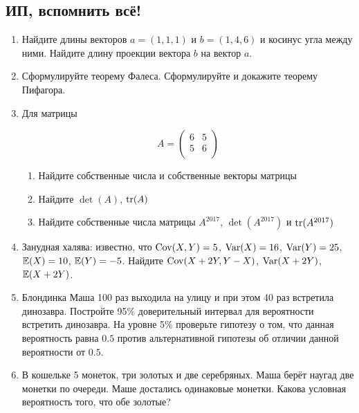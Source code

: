 \subsection{ИП, вспомнить всё!}

\begin{enumerate}
\item Найдите длины векторов $a=(1,1,1)$ и $b=(1,4,6)$ и косинус угла между ними. Найдите длину проекции вектора $b$ на вектор $a$.

\item Сформулируйте теорему Фалеса. Сформулируйте и докажите теорему Пифагора.


\item Для матрицы

\[
A=\begin{pmatrix}
6 & 5 \\
5 & 6 \\
\end{pmatrix}
\]

\begin{enumerate}
\item Найдите собственные числа и собственные векторы матрицы
\item Найдите $\det (A)$, $\operatorname{tr}(A)$
\item Найдите собственные числа матрицы $A^{2017}$, $\det (A^{2017})$ и $\operatorname{tr}(A^{2017})$
\end{enumerate}


\item Занудная халява: известно, что $\operatorname{Cov}(X, Y)=5$, $\operatorname{Var}(X)=16$, $\operatorname{Var}(Y)=25$, $\mathbb{E}(X)=10$, $\mathbb{E}(Y)=-5$. Найдите $\operatorname{Cov}(X+2Y, Y-X)$, $\operatorname{Var}(X+2Y)$, $\mathbb{E}(X+2Y)$.

\item Блондинка Маша 100 раз выходила на улицу и при этом 40 раз встретила динозавра. Постройте 95\% доверительный интервал для вероятности встретить динозавра. На уровне 5\% проверьте гипотезу о том, что данная вероятность равна $0.5$ против альтернативной гипотезы об отличии данной вероятности от $0.5$.

\item В кошельке 5 монеток, три золотых и две серебряных. Маша берёт наугад две монетки по очереди. Маше достались одинаковые монетки. Какова условная вероятность того, что обе золотые?
\end{enumerate}






